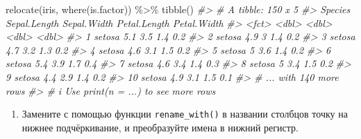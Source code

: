 \documentclass[
]{book}
\newenvironment{Shaded}{\begin{snugshade}}{\end{snugshade}}
\newcommand{\CommentTok}[1]{\textcolor[rgb]{0.56,0.35,0.01}{\textit{#1}}}
\newcommand{\FunctionTok}[1]{\textcolor[rgb]{0.00,0.00,0.00}{#1}}
\newcommand{\NormalTok}[1]{#1}
\newcommand{\SpecialCharTok}[1]{\textcolor[rgb]{0.00,0.00,0.00}{#1}}
\providecommand{\tightlist}{%
  \setlength{\itemsep}{0pt}\setlength{\parskip}{0pt}}
\begin{document}
\begin{Shaded}
\begin{Highlighting}[]
\FunctionTok{relocate}\NormalTok{(iris, }\FunctionTok{where}\NormalTok{(is.factor)) }\SpecialCharTok{\%\textgreater{}\%} 
  \FunctionTok{tibble}\NormalTok{()}
\CommentTok{\#\textgreater{} \# A tibble: 150 x 5}
\CommentTok{\#\textgreater{}    Species Sepal.Length Sepal.Width Petal.Length Petal.Width}
\CommentTok{\#\textgreater{}    \textless{}fct\textgreater{}          \textless{}dbl\textgreater{}       \textless{}dbl\textgreater{}        \textless{}dbl\textgreater{}       \textless{}dbl\textgreater{}}
\CommentTok{\#\textgreater{}  1 setosa           5.1         3.5          1.4         0.2}
\CommentTok{\#\textgreater{}  2 setosa           4.9         3            1.4         0.2}
\CommentTok{\#\textgreater{}  3 setosa           4.7         3.2          1.3         0.2}
\CommentTok{\#\textgreater{}  4 setosa           4.6         3.1          1.5         0.2}
\CommentTok{\#\textgreater{}  5 setosa           5           3.6          1.4         0.2}
\CommentTok{\#\textgreater{}  6 setosa           5.4         3.9          1.7         0.4}
\CommentTok{\#\textgreater{}  7 setosa           4.6         3.4          1.4         0.3}
\CommentTok{\#\textgreater{}  8 setosa           5           3.4          1.5         0.2}
\CommentTok{\#\textgreater{}  9 setosa           4.4         2.9          1.4         0.2}
\CommentTok{\#\textgreater{} 10 setosa           4.9         3.1          1.5         0.1}
\CommentTok{\#\textgreater{} \# ... with 140 more rows}
\CommentTok{\#\textgreater{} \# i Use \textasciigrave{}print(n = ...)\textasciigrave{} to see more rows}
\end{Highlighting}
\end{Shaded}

\begin{enumerate}
\def\labelenumi{\arabic{enumi}.}
\setcounter{enumi}{2}
\tightlist
\item
  Замените с помощью функции \texttt{rename\_with()} в названии столбцов точку на нижнее подчёркивание, и преобразуйте имена в нижний регистр.
\end{enumerate}
\end{document}
